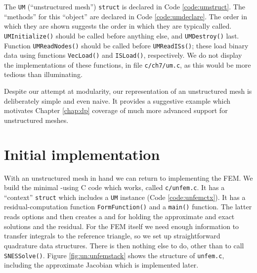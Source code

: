 The \texttt{UM} (``unstructured mesh'') \texttt{struct} is declared in Code \ref{code:umstruct}.  The ``methods'' for this ``object'' are declared in Code \ref{code:umdeclare}.  The order in which they are shown suggests the order in which they are typically called.  \texttt{UMInitialize()} should be called before anything else, and \texttt{UMDestroy()} last.  Function \texttt{UMReadNodes()} should be called before \texttt{UMReadISs()}; these load binary data using \PETSc functions  \texttt{VecLoad()} and \texttt{ISLoad()}, respectively.
We do not display the implementations of these functions, in file \texttt{c/ch7/um.c}, as this would be more tedious than illuminating.

Despite our attempt at modularity, our representation of an unstructured mesh is deliberately simple and even naive.  It provides a suggestive example which motivates Chapter \ref{chap:dp} coverage of much more advanced \PETSc support for unstructured meshes.



\section{Initial implementation}

With an unstructured mesh in hand we can return to implementing the FEM.  We build the minimal \pSNES-using C code which works, called \texttt{c/\CODELOC unfem.c}.  It has a ``context'' \texttt{struct} which includes a \texttt{UM} instance (Code \eqref{code:unfemctx}).  It has a residual-computation function \texttt{FormFunction()} and a \texttt{main()} function.  The latter reads options and then creates a \pSNES and \pVecs for holding the approximate and exact solutions and the residual.  For the FEM itself we need enough information to transfer integrals to the reference triangle, so we set up straightforward quadrature data structures.  There is then nothing else to do, other than to call \texttt{SNESSolve()}.  Figure \ref{fig:un:unfemstack} shows the structure of \texttt{unfem.c}, including the approximate Jacobian which is implemented later.

